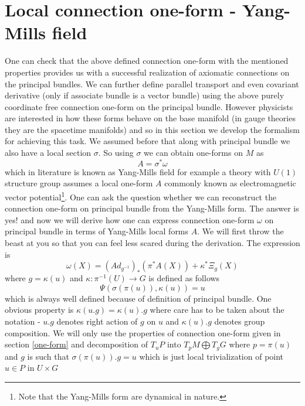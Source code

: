 \documentclass[12pt]{article}
\begin{document}
\section{Local connection one-form - Yang-Mills field}
One can check that the above defined connection one-form with the mentioned properties provides us with a successful realization of axiomatic connections on the principal bundles. We can further define parallel transport and even covariant derivative (only if associate bundle is a vector bundle) using the above purely coordinate free connection one-form on the principal bundle. However physicists are interested in how these forms behave on the base manifold (in gauge theories they are the spacetime manifolds) and so in this section we develop the formalism for achieving this task. We assumed before that along with principal bundle we also have a local section $\sigma$. So using $\sigma$ we can obtain one-forms on $M$ as 
\[
A = \sigma^{\ast}\omega
\]which in literature is known as Yang-Mills field for example a theory with $U(1)$ structure group assumes a local one-form $A$ commonly known as electromagnetic vector potential\footnote{Note that the Yang-Mills form are dynamical in nature.}. One can ask the question whether we can reconstruct the connection one-form on principal bundle from the Yang-Mills form. The answer is yes! and now we will derive how one can express connection one-form $\omega$ on principal bundle in terms of Yang-Mills local forms $A$. We will first throw the beast at you so that you can feel less scared during the derivation. The expression is
\begin{equation}
    \omega(X) = (Ad_{g^{-1}})_{\ast}(\pi^{\ast}A(X)) + \kappa^{\ast}\Xi_{g}(X)
\end{equation} where $g = \kappa(u)$ and $\kappa \colon \pi^{-1}(U) \to G$ is defined as follows
\[
\Psi(\sigma(\pi(u)), \kappa(u)) = u
\] which is always well defined because of definition of principal bundle. One obvious property is $\kappa(u.g) = \kappa(u).g $ where  care has to be taken about the notation - $u.g$ denotes right action of $g$ on $u$ and $\kappa(u).g$ denotes group composition. We will only use the properties of connection one-form given in section \ref{one-form} and decomposition of $T_{u}P$ into $T_{p}M\bigoplus T_{g}G$ where $p = \pi(u)$ and $g$ is such that $\sigma(\pi(u)).g = u$ which is just local trivialization of point $u \in P$ in $U\times G$
\end{document}
